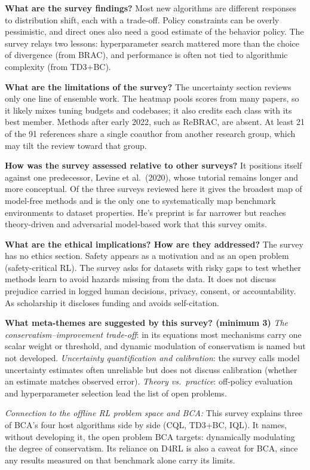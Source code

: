 \documentclass[11pt]{article}
\newcommand{\q}[2]{\item \textbf{#1} #2}
\newcommand{\tiein}[1]{\par\smallskip\noindent\emph{Connection to the offline RL problem space and BCA:} #1\par\medskip}
\begin{document}
\begin{qna}
\q{What are the survey findings?}
Most new algorithms are different responses to distribution shift, each with a trade-off. Policy constraints can be overly pessimistic, and direct ones also need a good estimate of the behavior policy. The survey relays two lessons: hyperparameter search mattered more than the choice of divergence (from BRAC), and performance is often not tied to algorithmic complexity (from TD3+BC).

\q{What are the limitations of the survey?}
The uncertainty section reviews only one line of ensemble work. The heatmap pools scores from many papers, so it likely mixes tuning budgets and codebases; it also credits each class with its best member. Methods after early 2022, such as ReBRAC, are absent. At least 21 of the 91 references share a single coauthor from another research group, which may tilt the review toward that group.

\q{How was the survey assessed relative to other surveys?}
It positions itself against one predecessor, Levine et al.\ (2020), whose tutorial remains longer and more conceptual. Of the three surveys reviewed here it gives the broadest map of model-free methods and is the only one to systematically map benchmark environments to dataset properties. He's preprint is far narrower but reaches theory-driven and adversarial model-based work that this survey omits.

\q{What are the ethical implications? How are they addressed?}
The survey has no ethics section. Safety appears as a motivation and as an open problem (safety-critical RL). The survey asks for datasets with risky gaps to test whether methods learn to avoid hazards missing from the data. It does not discuss prejudice carried in logged human decisions, privacy, consent, or accountability. As scholarship it discloses funding and avoids self-citation.

\q{What meta-themes are suggested by this survey? (minimum 3)}
\emph{The conservatism--improvement trade-off}: in its equations most mechanisms carry one scalar weight or threshold, and dynamic modulation of conservatism is named but not developed. \emph{Uncertainty quantification and calibration}: the survey calls model uncertainty estimates often unreliable but does not discuss calibration (whether an estimate matches observed error). \emph{Theory vs.\ practice}: off-policy evaluation and hyperparameter selection lead the list of open problems.

\end{qna}
\tiein{This survey explains three of BCA's four host algorithms side by side (CQL, TD3+BC, IQL). It names, without developing it, the open problem BCA targets: dynamically modulating the degree of conservatism. Its reliance on D4RL is also a caveat for BCA, since any results measured on that benchmark alone carry its limits.}
\end{document}
